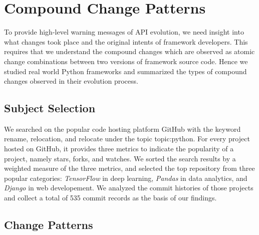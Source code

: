 \chapter{Compound Change Patterns}
\label{chap:compound-changes}

To provide high-level warning messages of API evolution, we need insight into what changes took place and the original intents of framework developers. This requires that we understand the compound changes which are observed as atomic change combinations between two versions of framework source code. Hence we studied real world Python frameworks and summarized the types of compound changes observed in their evolution process.

\section{Subject Selection}

We searched on the popular code hosting platform GitHub with the keyword rename, relocation, and relocate under the topic topic:python. For every project hosted on GitHub, it provides three metrics to indicate the popularity of a project, namely stars, forks, and watches. We sorted the search results by a weighted measure of the three metrics, and selected the top repository from three popular categories: \textit{TensorFlow} in deep learning, \textit{Pandas} in data analytics, and \textit{Django} in web developement. We analyzed the commit histories of those projects and collect a total of 535 commit records as the basis of our findings.

\section{Change Patterns}

